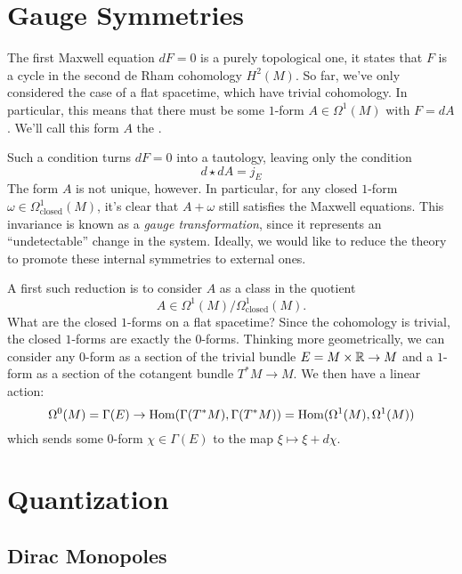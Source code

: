 \documentclass{article}
\begin{document}
\section{Gauge Symmetries}
The first Maxwell equation $dF=0$ is a purely topological one, it states that $F$ is a cycle in the second de Rham cohomology $H^2(M)$. So far, we've only considered the case of a flat spacetime, which have trivial cohomology. In particular, this means that there must be some $1$-form $A\in \Omega^1(M)$ with $F=dA$. We'll call this form $A$ the .

Such a condition turns $dF=0$ into a tautology, leaving only the condition
\[
  d\!\star\! d A = j_E
\]
The form $A$ is not unique, however. In particular, for any closed $1$-form $\omega\in \Omega^1_{\textrm{closed}}(M)$, it's clear that $A+\omega$ still satisfies the Maxwell equations. This invariance is known as a \emph{gauge transformation}, since it represents an ``undetectable'' change in the system. Ideally, we would like to reduce the theory to promote these internal symmetries to external ones.

A first such reduction is to consider $A$ as a class in the quotient \[A\in \Omega^{1}(M)/\Omega^1_{\textrm{closed}}(M).\]
What are the closed $1$-forms on a flat spacetime? Since the cohomology is trivial, the closed $1$-forms are exactly the $0$-forms. Thinking more geometrically, we can consider any $0$-form as a section of the trivial bundle $E=M\times \mathbb{R} \to M$ and a $1$-form as a section of the cotangent bundle $T^*M \to M$. We then have a linear action:
\[
  \Omega^0(M)=\Gamma(E) \to \mathrm{Hom}(\Gamma(T^* M), \Gamma(T^* M)) = \mathrm{Hom}(\Omega^1(M), \Omega^1(M))
\]
which sends some $0$-form $\chi\in\Gamma(E)$ to the map $\xi \mapsto \xi + d\chi$.

\section{Quantization}
\subsection{Dirac Monopoles}


{}

\end{document}
